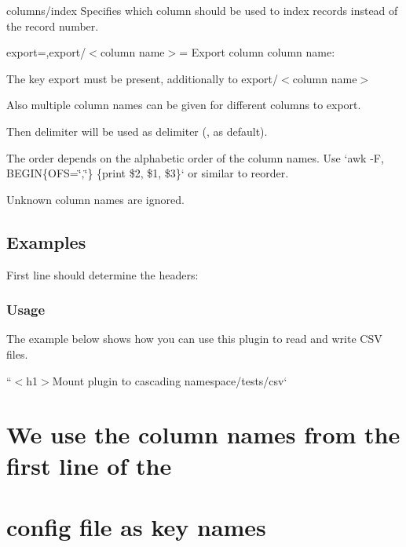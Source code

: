 {\ttfamily columns/index} Specifies which column should be used to index records instead of the record number.

{\ttfamily export=,export/$<$column name$>$=} Export column {\ttfamily column name}\+:


\begin{DoxyItemize}
\item The key {\ttfamily export} must be present, additionally to {\ttfamily export/$<$column name$>$}
\item Also multiple column names can be given for different columns to export.
\begin{DoxyItemize}
\item Then {\ttfamily delimiter} will be used as delimiter ({\ttfamily ,} as default).
\item The order depends on the alphabetic order of the column names. Use `awk -\/F\textquotesingle{},\textquotesingle{} \textquotesingle{}B\+E\+G\+IN\{O\+FS=\char`\"{},\char`\"{}\} \{print \$2, \$1, \$3\}\textquotesingle{}` or similar to reorder.
\item Unknown column names are ignored.
\end{DoxyItemize}
\end{DoxyItemize}

\subsection*{Examples}

First line should determine the headers\+: 


\subsubsection*{Usage}

The example below shows how you can use this plugin to read and write C\+SV files.

``{\ttfamily  $<$h1$>$Mount plugin to cascading namespace}/tests/csv` \section*{We use the column names from the first line of the}

\section*{config file as key names}

